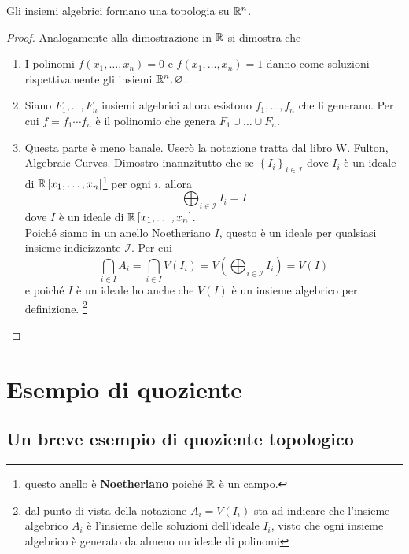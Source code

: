 \begin{theorem}
	Gli insiemi algebrici formano una topologia su $\mathbb{R}^n$.
\end{theorem}
\begin{proof}
	Analogamente alla dimostrazione in $\mathbb{R}$ si dimostra che
	\begin{enumerate}
		\item I polinomi $f(x_1, \dots, x_n) = 0$ e $f(x_1, \dots, x_n) = 1$ danno come soluzioni rispettivamente gli insiemi $\mathbb{R}^n, \varnothing$.
		\item Siano $F_1, \dots, F_n$ insiemi algebrici allora esistono $f_1, \dots, f_n$ che li generano. Per cui $f = f_1 \cdots f_n$ è il polinomio che genera $F_1 \cup \dots \cup F_n$.
		\item Questa parte è meno banale. Userò la notazione tratta dal libro W. Fulton, Algebraic Curves. Dimostro inannzitutto che se $\left\{I_i\right\}_{i \in \mathcal{I}}$ dove $I_i$ è un ideale di $\mathbb{R}\left[x_1, \dots, x_n\right]$\footnote{questo anello è \textbf{Noetheriano} poiché $\mathbb{R}$ è un campo.} per ogni $i$, allora 
		\begin{equation*}
			\bigoplus_{i \in \mathcal{I}} I_i = I
		\end{equation*}
		dove $I$ è un ideale di $\mathbb{R}\left[x_1, \dots, x_n\right]$. \\ Poiché siamo in un anello Noetheriano $I$, questo è un ideale per qualsiasi insieme indicizzante $\mathcal{I}$. 
		Per cui 
		\begin{equation*}
		\bigcap_{i \in I} A_i = \bigcap_{i \in I} V(I_i) = V\left(\bigoplus_{i \in \mathcal{I}} I_i\right) = V(I)
		\end{equation*}
		e poiché $I$ è un ideale ho anche che $V(I)$ è un insieme algebrico per definizione. \footnote{dal punto di vista della notazione $A_i = V(I_i)$ sta ad indicare che l'insieme algebrico $A_i$ è l'insieme delle soluzioni dell'ideale $I_i$, visto che ogni insieme algebrico è generato da almeno un ideale di polinomi}
	\end{enumerate}	
\end{proof}



\section{Esempio di quoziente}
\subsection{\textcolor{TopGener}{\textbf{Un breve esempio di quoziente topologico}}}
	


